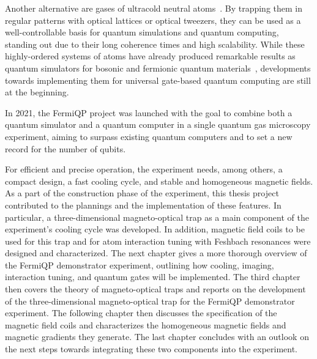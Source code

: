 Another alternative are gases of ultracold neutral atoms~\cite{deutsch_quantum_2000}. By trapping them in regular patterns with optical lattices or optical tweezers, they can be used as a well-controllable basis for quantum simulations and quantum computing, standing out due to their long coherence times and high scalability. While these highly-ordered systems of atoms have already produced remarkable results as quantum simulators for bosonic and fermionic quantum materials~\cite{bloch_quantum_2012, gross_quantum_2017}, developments towards implementing them for universal gate-based quantum computing are still at the beginning.

In 2021, the FermiQP project was launched with the goal to combine both a quantum simulator and a quantum computer in a single quantum gas microscopy experiment, aiming to surpass existing quantum computers and to set a new record for the number of qubits.

For efficient and precise operation, the experiment needs, among others, a compact design, a fast cooling cycle, and stable and homogeneous magnetic fields. As a part of the construction phase of the experiment, this thesis project contributed to the plannings and the implementation of these features. In particular, a three-dimensional magneto-optical trap as a main component of the experiment's cooling cycle was developed. In addition, magnetic field coils to be used for this trap and for atom interaction tuning with Feshbach resonances were designed and characterized. The next chapter gives a more thorough overview of the FermiQP demonstrator experiment, outlining how cooling, imaging, interaction tuning, and quantum gates will be implemented. The third chapter then covers the theory of magneto-optical traps and reports on the development of the three-dimensional magneto-optical trap for the FermiQP demonstrator experiment. The following chapter then discusses the specification of the magnetic field coils and characterizes the homogeneous magnetic fields and magnetic gradients they generate. The last chapter concludes with an outlook on the next steps towards integrating these two components into the experiment.


